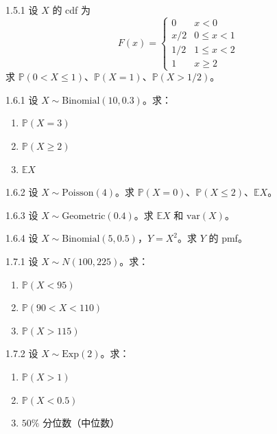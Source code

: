 \begin{exercise}{1.5.1}
设 $X$ 的 cdf 为
\[
F(x) = \begin{cases} 0 & x < 0 \\ x/2 & 0 \leq x < 1 \\ 1/2 & 1 \leq x < 2 \\ 1 & x \geq 2 \end{cases}
\]
求 $\mathbb{P}(0 < X \leq 1)$、$\mathbb{P}(X = 1)$、$\mathbb{P}(X > 1/2)$。
\end{exercise}

\begin{exercise}{1.6.1}
设 $X \sim \text{Binomial}(10, 0.3)$。求：
\begin{enumerate}
    \item $\mathbb{P}(X = 3)$
    \item $\mathbb{P}(X \geq 2)$
    \item $\mathbb{E}X$
\end{enumerate}
\end{exercise}

\begin{exercise}{1.6.2}
设 $X \sim \text{Poisson}(4)$。求 $\mathbb{P}(X = 0)$、$\mathbb{P}(X \leq 2)$、$\mathbb{E}X$。
\end{exercise}

\begin{exercise}{1.6.3}
设 $X \sim \text{Geometric}(0.4)$。求 $\mathbb{E}X$ 和 $\text{var}(X)$。
\end{exercise}

\begin{exercise}{1.6.4}
设 $X \sim \text{Binomial}(5, 0.5)$，$Y = X^2$。求 $Y$ 的 pmf。
\end{exercise}

\begin{exercise}{1.7.1}
设 $X \sim N(100, 225)$。求：
\begin{enumerate}
    \item $\mathbb{P}(X < 95)$
    \item $\mathbb{P}(90 < X < 110)$
    \item $\mathbb{P}(X > 115)$
\end{enumerate}
\end{exercise}

\begin{exercise}{1.7.2}
设 $X \sim \text{Exp}(2)$。求：
\begin{enumerate}
    \item $\mathbb{P}(X > 1)$
    \item $\mathbb{P}(X < 0.5)$
    \item $50\%$ 分位数（中位数）
\end{enumerate}
\end{exercise}

